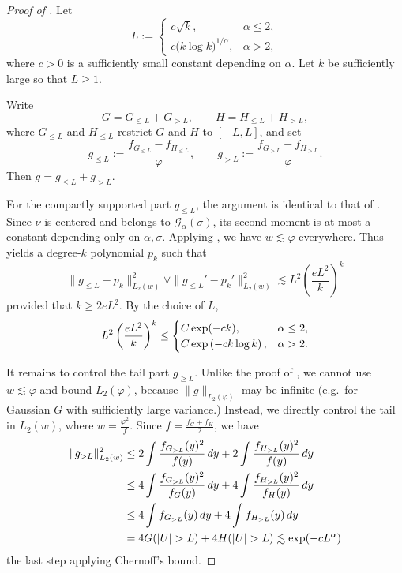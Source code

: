 \documentclass[letterpaper,11pt]{article}
\def\exp{\mathop{\rm exp}}
\newcommand{\pth}[1]{\left( #1 \right)}
\newcommand{\calG}{{\mathcal{G}}}
\theoremstyle{definition}
\begin{document}
\begin{proof}[Proof of ]
Let
  \[
    L:=
    \begin{cases}
      c \sqrt{k},
      & \alpha\leq 2,\\
      c \bigl(k\log k\bigr)^{1/\alpha},
      & \alpha>2,
    \end{cases}
  \]
  where $c>0$ is a sufficiently small constant depending on $\alpha$.
  Let $k$ be sufficiently large so that $L\geq 1$.

  Write
  \[
    G=G_{\leq L}+G_{>L},
    \qquad
    H=H_{\leq L}+H_{>L},
  \]
  where $G_{\leq L}$ and $H_{\leq L}$ restrict $G$ and $H$ to $[-L,L]$, and set
  \[
    g_{\leq L}
    :=
    \frac{f_{G_{\leq L}}-f_{H_{\leq L}}}{\varphi},
    \qquad
    g_{>L}
    :=
    \frac{f_{G_{>L}}-f_{H_{>L}}}{\varphi}.
  \]
  Then $
    g=g_{\leq L}+g_{>L}$.

  For the compactly supported part $g_{\le L}$, the argument is identical to that of 
  . Since $\nu$ is centered and belongs to $\calG_\alpha(\sigma)$, its second
  moment is at most a constant depending only on $\alpha,\sigma$.
  Applying , we have $w \lesssim \varphi$ everywhere.
Thus  yields a degree-$k$ polynomial $p_k$ such that
  \[
    \|g_{\leq L}-p_k\|_{L_2(w)}^2
    \vee
    \|g_{\leq L}'-p_k'\|_{L_2(w)}^2
    \lesssim
    L^2 \pth{\frac{eL^2}{k}}^k
  \]
  provided that $k \geq 2e L^2$.
  By the choice of $L$,
  \[
    L^2 \pth{\frac{eL^2}{k}}^k
    \leq
    \begin{cases}
      C\exp(-c k),
      & \alpha\leq 2,\\
      C\exp\pth{-c k\log k},
      & \alpha>2.
    \end{cases}
  \]

  It remains to control the tail part $g_{\ge L}$. Unlike the proof of 
  , we cannot use $w \lesssim \varphi$ and bound $L_2(\varphi)$, because $\|g\|_{L_2(\varphi)}$ may be infinite (e.g.~for Gaussian $G$ with sufficiently large variance.)
  Instead, we directly control the tail in $L_2(w)$, where $w=\frac{\varphi^2}{f}$. Since
  $f=\frac{f_G+f_H}{2}$, we have
  \begin{align*}
    \|g_{>L}\|_{L_2(w)}^2
    &\leq
    2 \int \frac{f_{G_{>L}}(y)^2}{f(y)}\,dy
    +
    2 \int \frac{f_{H_{>L}}(y)^2}{f(y)}\,dy\\
    &\leq
    4 \int \frac{f_{G_{>L}}(y)^2}{f_G(y)}\,dy
    +
    4 \int \frac{f_{H_{>L}}(y)^2}{f_H(y)}\,dy\\
    &\leq
    4 \int f_{G_{>L}}(y)\,dy
    +
    4 \int f_{H_{>L}}(y)\,dy\\
    &=
    4 G(|U|>L)+4 H(|U|>L) \lesssim
    \exp(-c L^\alpha)
  \end{align*}
  the last step applying Chernoff's bound.


\end{proof}
\end{document}
